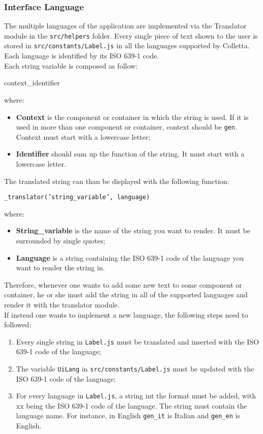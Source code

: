 \subsubsection{Interface Language}
The multiple languages of the application are implemented via the Translator module in the \texttt{src/helpers} folder. Every single piece of text shown to the user is stored in \texttt{src/constants/Label.js} in all the languages supported by Colletta. Each language is identified by its ISO 639-1 code.\\
Each string variable is composed as follow:
\begin{center}
context\_identifier
\end{center}
where:
\begin{itemize}
\item \textbf{Context} is the component or container in which the string is used. If it is used in more than one component or container, context should be \texttt{gen}. Context must start with a lowercase letter;
\item \textbf{Identifier} should sum up the function of the string. It must start with a lowercase letter.
\end{itemize}
The translated string can than be displayed with the following function:
\begin{center}
\texttt{\_translator('string\_variable', language)}
\end{center}
where:
\begin{itemize}
\item \textbf{String\_variable} is the name of the string you want to render. It must be surrounded by single quotes;
\item \textbf{Language} is a string containing the ISO 639-1 code of the language you want to render the string in.
\end{itemize}
Therefore, whenever one wants to add some new text to some component or container, he or she must add the string in all of the supported languages and render it with the translator module.\\
If instead one wants to implement a new language, the following steps need to followed:
\begin{enumerate}
\item Every single string in \texttt{Label.js} must be translated and inserted with the ISO 639-1 code of the language;
\item The variable \texttt{UiLang} in \texttt{src/constants/Label.js} must be updated with the ISO 639-1 code of the language;
\item For every language in \texttt{Label.js}, a string int the format  must be added, with xx being the ISO 639-1 code of the language. The string must contain the language name. For instance, in English \texttt{gen\_it} is Italian and \texttt{gen\_en} is English.
\end{enumerate}
